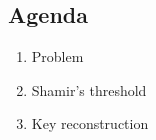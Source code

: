 

\subsection{Agenda}
\begin{enumerate}
\item Problem
\item Shamir's threshold
\item Key reconstruction
\end{enumerate}